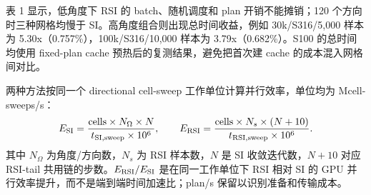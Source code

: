 \documentclass[10pt]{article}
\begin{document}
表 1 显示，低角度下 RSI 的 batch、随机调度和 plan 开销不能摊销；120 个方向时三种网格均慢于 SI。高角度组合则出现总时间收益，例如 30k/S316/5,000 样本为 5.30x（0.757\%），100k/S316/10,000 样本为 3.79x（0.682\%）。S100 的总时间均使用 fixed-plan cache 预热后的复测结果，避免把首次建 cache 的成本混入网格间对比。

两种方法按同一个 directional cell-sweep 工作单位计算并行效率，单位均为 Mcell-sweeps/s：
\[
E_{\rm SI}=\frac{\mathrm{cells}\times N_{\Omega}\times N}{t_{\rm SI,sweep}\times10^6},\qquad
E_{\rm RSI}=\frac{\mathrm{cells}\times N_s\times(N+10)}{t_{\rm RSI,sweep}\times10^6}.
\]
其中 $N_{\Omega}$ 为角度/方向数，$N_s$ 为 RSI 样本数，$N$ 是 SI 收敛迭代数，$N+10$ 对应 RSI-tail 共用链的步数。$E_{\rm RSI}/E_{\rm SI}$ 是在同一工作单位下 RSI 相对 SI 的 GPU 并行效率提升，而不是端到端时间加速比；plan/s 保留以识别准备和传输成本。
\end{document}
